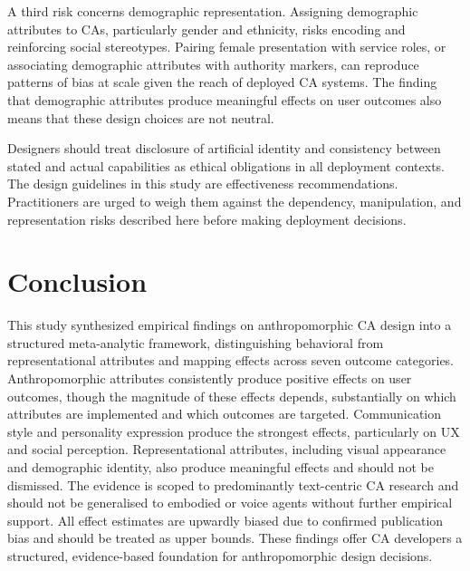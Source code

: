 \documentclass[lettersize,journal]{IEEEtran}
\begin{document}
A third risk concerns demographic representation. Assigning demographic attributes to CAs, particularly gender and ethnicity, risks encoding and reinforcing social stereotypes. Pairing female presentation with service roles, or associating demographic attributes with authority markers, can reproduce patterns of bias at scale given the reach of deployed CA systems. The finding that demographic attributes produce meaningful effects on user outcomes also means that these design choices are not neutral.

Designers should treat disclosure of artificial identity and consistency between stated and actual capabilities as ethical obligations in all deployment contexts. The design guidelines in this study are effectiveness recommendations. Practitioners are urged to weigh them against the dependency, manipulation, and representation 
risks described here before making deployment decisions.


\section{Conclusion}

This study synthesized empirical findings on anthropomorphic CA design into a structured meta-analytic framework, distinguishing behavioral from representational attributes and mapping effects across seven outcome categories. Anthropomorphic attributes consistently produce positive effects on user outcomes, though the magnitude of these effects depends, substantially on which attributes are implemented and which outcomes are targeted. Communication style and personality expression produce the strongest effects, particularly on UX and social perception. Representational attributes, including visual appearance and demographic identity, also produce meaningful effects and should not be dismissed. The evidence is scoped to predominantly text-centric CA research and should not be generalised to embodied or voice agents without further empirical support. All effect estimates are upwardly biased due to confirmed publication bias and should be treated as upper bounds. These findings offer CA developers a structured, evidence-based foundation for anthropomorphic design decisions.



\end{document}
